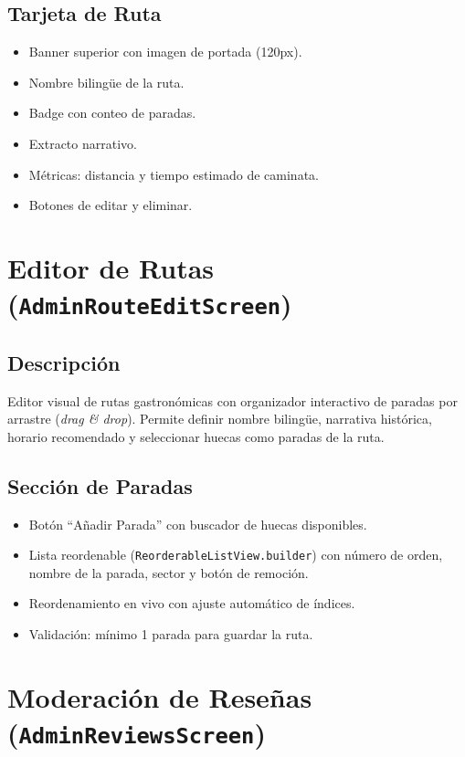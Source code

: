 \documentclass[11pt, a4paper, oneside]{report}
\begin{document}
\subsection{Tarjeta de Ruta}
\begin{itemize}
  \item Banner superior con imagen de portada (120px).
  \item Nombre bilingüe de la ruta.
  \item Badge con conteo de paradas.
  \item Extracto narrativo.
  \item Métricas: distancia y tiempo estimado de caminata.
  \item Botones de editar y eliminar.
\end{itemize}

\section{Editor de Rutas (\texttt{AdminRouteEditScreen})}

\subsection{Descripción}
Editor visual de rutas gastronómicas con organizador interactivo de paradas por arrastre (\textit{drag \& drop}). Permite definir nombre bilingüe, narrativa histórica, horario recomendado y seleccionar huecas como paradas de la ruta.

\subsection{Sección de Paradas}
\begin{itemize}
  \item Botón ``Añadir Parada'' con buscador de huecas disponibles.
  \item Lista reordenable (\texttt{ReorderableListView.builder}) con número de orden, nombre de la parada, sector y botón de remoción.
  \item Reordenamiento en vivo con ajuste automático de índices.
  \item Validación: mínimo 1 parada para guardar la ruta.
\end{itemize}

\section{Moderación de Reseñas (\texttt{AdminReviewsScreen})}
\end{document}
